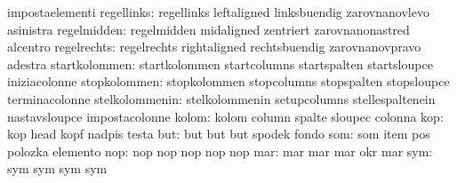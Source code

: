                                   impostaelementi
                      regellinks: regellinks                       leftaligned
                                  linksbuendig                     zarovnanovlevo
                                  asinistra                        %
                     regelmidden: regelmidden                      midaligned
                                  zentriert                        zarovnanonastred
                                  alcentro
                     regelrechts: regelrechts                      rightaligned
                                  rechtsbuendig                    zarovnanovpravo
                                  adestra
                   startkolommen: startkolommen                    startcolumns
                                  startspalten                     startsloupce
                                  iniziacolonne
                    stopkolommen: stopkolommen                     stopcolumns
                                  stopspalten                      stopsloupce
                                  terminacolonne
                  stelkolommenin: stelkolommenin                   setupcolumns
                                  stellespaltenein                 nastavsloupce
                                  impostacolonne
                           kolom: kolom                            column
                                  spalte                           sloupec
                                  colonna
                             kop: kop                              head
                                  kopf                             nadpis
                                  testa                            %
                             but: but                              but
                                  but                              spodek
                                  fondo
                             som: som                              item
                                  pos                              polozka
                                  elemento
                             nop: nop                              nop
                                  nop                              nop
                                  nop
                             mar: mar                              mar
                                  mar                              okr
                                  mar
                             sym: sym                              sym
                                  sym                              sym
